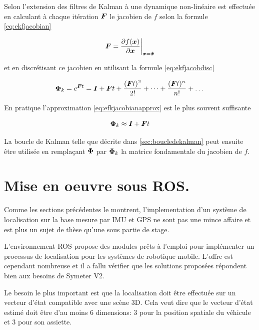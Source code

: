 \documentclass[12pt,a4paper]{report}
\begin{document}
	\para Selon \cite{zarchan_fundamentals_2009} l'extension des filtres de Kalman à une dynamique non-linéaire est effectuée en calculant à chaque itération $\boldsymbol{F}$ le jacobien de $f$ selon la formule \ref{eq:ekfjacobian}
	
	\begin{equation}
	\label{eq:ekfjacobian}
	\boldsymbol{F} = \frac{\partial f(\boldsymbol{x})}{\partial \boldsymbol{x}} \bigg\rvert_{\boldsymbol{x}= \boldsymbol{\hat{x}}}
	\end{equation}
	
	\para et en discrétisant ce jacobien en utilisant la formule \ref{eq:ekfjacobdisc}
	
	\begin{equation}
	\label{eq:ekfjacobdisc}
	\boldsymbol{\Phi}_k = e^{\boldsymbol Ft} = \boldsymbol I + \boldsymbol Ft + \frac{(\boldsymbol Ft)^2}{2!} + \dots + \frac{(\boldsymbol Ft)^n}{n!} + \dots
	\end{equation}
	
	\para En pratique l'approximation \ref{eq:efkjacobianapprox} est le plus souvent suffisante
	
	\begin{equation}
	\label{eq:efkjacobianapprox}
	\boldsymbol{\Phi}_k \approx \boldsymbol I + \boldsymbol Ft
	\end{equation}
	
	La boucle de Kalman telle que décrite dans \ref{sec:boucledekalman} peut ensuite être utilisée en remplaçant $\boldsymbol{\Phi}$ par $\boldsymbol{\Phi}_k$ la matrice fondamentale du jacobien de $f$.

	
	\section{Mise en oeuvre sous ROS.} Comme les sections précédentes le montrent, l'implementation d'un système de localisation sur la base mesure par IMU et GPS ne sont pas une mince affaire et est plus un sujet de thèse qu'une sous partie de stage. 
	
	\para L'environnement ROS propose des modules prêts à l'emploi pour implémenter un processus de localisation pour les systèmes de robotique mobile. L'offre est cependant nombreuse et il a fallu vérifier que les solutions proposées répondent bien aux besoins de Symeter V2.
	
	\para Le besoin le plus important est que la localisation doit être effectuée sur un vecteur d'état compatible avec une scène 3D. Cela veut dire que le vecteur d'état estimé doit être d'au moins 6 dimensions: 3 pour la position spatiale du véhicule et 3 pour son assiette.
	
\end{document}

